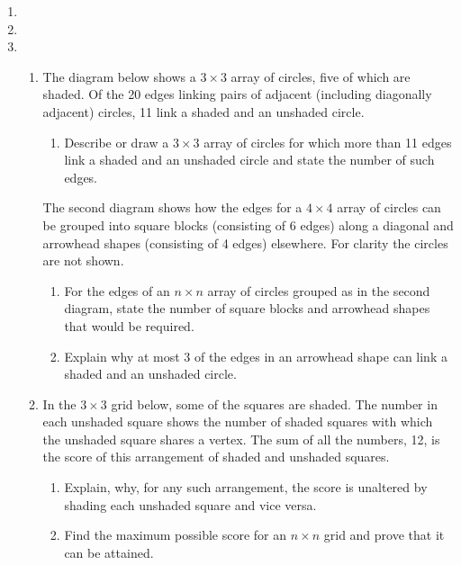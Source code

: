 \begin{enumerate}
\begin{solution}
\begin{enumerate}[label=(\alph*)]
\item 
\end{enumerate}
\end{solution}

\item 
\item 
\item \begin{enumerate}[label=(\alph*)]
\item The diagram below shows a $3\times3$ array of circles, five of which are shaded. Of the 20 edges linking pairs of adjacent (including diagonally adjacent) circles, 11 link a shaded and an unshaded circle.
\begin{enumerate}[label=(\roman*)]
    \item Describe or draw a $3\times3$ array of circles for which more than 11 edges link a shaded and an unshaded circle and state the number of such edges.
\end{enumerate}
The second diagram shows how the edges for a $4\times4$ array of circles can be grouped into square blocks (consisting of 6 edges) along a diagonal and arrowhead shapes (consisting of 4 edges) elsewhere. For clarity the circles are not shown.
\begin{enumerate}[resume*]
    \item For the edges of an $n\times n$ array of circles grouped as in the second diagram, state the number of square blocks and arrowhead shapes that would be required.
    \item Explain why at most 3 of the edges in an arrowhead shape can link a shaded and an unshaded circle.
\end{enumerate}
\item In the $3\times3$ grid below, some of the squares are shaded. The number in each unshaded square shows the number of shaded squares with which the unshaded square shares a vertex. The sum of all the numbers, 12, is the score of this arrangement of shaded and unshaded squares.
\begin{enumerate}[label=(\roman*)]
    \item Explain, why, for any such arrangement, the score is unaltered by shading each unshaded square and vice versa.
    \item Find the maximum possible score for an $n\times n$ grid and prove that it can be attained.
\end{enumerate}
\end{enumerate}
\end{enumerate}
\pagebreak

